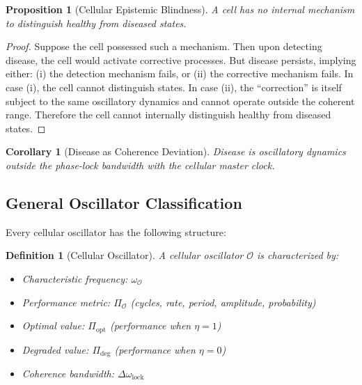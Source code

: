 \documentclass[aps,prd,twocolumn,superscriptaddress,floatfix,nofootinbib]{revtex4-2}
\newtheorem{corollary}[theorem]{Corollary}
\newtheorem{definition}[theorem]{Definition}
\newtheorem{proposition}[theorem]{Proposition}
\theoremstyle{remark}
\begin{document}
\begin{proposition}[Cellular Epistemic Blindness]
\label{prop:blindness}
A cell has no internal mechanism to distinguish healthy from diseased states.
\end{proposition}

\begin{proof}
Suppose the cell possessed such a mechanism. Then upon detecting disease, the cell would activate corrective processes. But disease persists, implying either: (i) the detection mechanism fails, or (ii) the corrective mechanism fails. In case (i), the cell cannot distinguish states. In case (ii), the ``correction'' is itself subject to the same oscillatory dynamics and cannot operate outside the coherent range. Therefore the cell cannot internally distinguish healthy from diseased states.
\end{proof}

\begin{corollary}[Disease as Coherence Deviation]
\label{cor:disease_coherence}
Disease is oscillatory dynamics outside the phase-lock bandwidth with the cellular master clock.
\end{corollary}

\subsection{General Oscillator Classification}

Every cellular oscillator has the following structure:

\begin{definition}[Cellular Oscillator]
\label{def:cellular_oscillator}
A cellular oscillator $\mathcal{O}$ is characterized by:
\begin{itemize}
\item Characteristic frequency: $\omega_{\mathcal{O}}$
\item Performance metric: $\Pi_{\mathcal{O}}$ (cycles, rate, period, amplitude, probability)
\item Optimal value: $\Pi_{\mathrm{opt}}$ (performance when $\eta = 1$)
\item Degraded value: $\Pi_{\mathrm{deg}}$ (performance when $\eta = 0$)
\item Coherence bandwidth: $\Delta\omega_{\mathrm{lock}}$
\end{itemize}
\end{definition}
\end{document}
